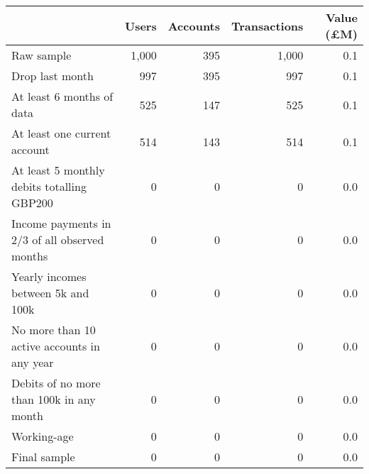 \begin{tabular}{lrrrr}
\toprule
                                              & Users & Accounts & Transactions & Value (\pounds M) \\
\midrule
                                   Raw sample & 1,000 &      395 &        1,000 &               0.1 \\
                              Drop last month &   997 &      395 &          997 &               0.1 \\
                    At least 6 months of data &   525 &      147 &          525 &               0.1 \\
                 At least one current account &   514 &      143 &          514 &               0.1 \\
   At least 5 monthly debits totalling GBP200 &     0 &        0 &            0 &               0.0 \\
Income payments in 2/3 of all observed months &     0 &        0 &            0 &               0.0 \\
           Yearly incomes between 5k and 100k &     0 &        0 &            0 &               0.0 \\
  No more than 10 active accounts in any year &     0 &        0 &            0 &               0.0 \\
     Debits of no more than 100k in any month &     0 &        0 &            0 &               0.0 \\
                                  Working-age &     0 &        0 &            0 &               0.0 \\
                                 Final sample &     0 &        0 &            0 &               0.0 \\
\bottomrule
\end{tabular}

